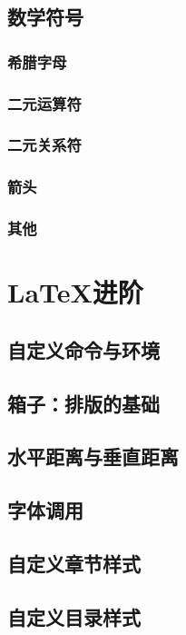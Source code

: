 {\section{数学符号}
\subsection{希腊字母}

\subsection{二元运算符}

\subsection{二元关系符}

\subsection{箭头}

\subsection{其他}


\chapter{\LaTeX{}进阶}
\section{自定义命令与环境}
\label{sec:newcommand}
\section{箱子：排版的基础}
\label{sec:box}
\section{水平距离与垂直距离}
\label{sec:hvspace}
\section{字体调用}
\section{自定义章节样式}
\label{sec:titlesec}
\section{自定义目录样式}
\label{sec:titletoc}
}
